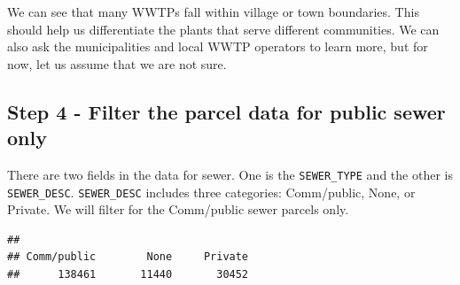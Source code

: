\documentclass[
]{book}
\newenvironment{Shaded}{\begin{snugshade}}{\end{snugshade}}
\newcommand{\CommentTok}[1]{\textcolor[rgb]{0.56,0.35,0.01}{\textit{#1}}}
\newcommand{\FunctionTok}[1]{\textcolor[rgb]{0.00,0.00,0.00}{#1}}
\newcommand{\NormalTok}[1]{#1}
\newcommand{\SpecialCharTok}[1]{\textcolor[rgb]{0.00,0.00,0.00}{#1}}
\begin{document}
We can see that many WWTPs fall within village or town boundaries. This should help us differentiate the plants that serve different communities. We can also ask the municipalities and local WWTP operators to learn more, but for now, let us assume that we are not sure.

\hypertarget{step-4---filter-the-parcel-data-for-public-sewer-only}{%
\subsection{Step 4 - Filter the parcel data for public sewer only}\label{step-4---filter-the-parcel-data-for-public-sewer-only}}

There are two fields in the data for sewer. One is the \texttt{SEWER\_TYPE} and the other is \texttt{SEWER\_DESC}. \texttt{SEWER\_DESC} includes three categories: Comm/public, None, or Private. We will filter for the Comm/public sewer parcels only.

\begin{Shaded}
\end{Shaded}

\begin{verbatim}
## 
## Comm/public        None     Private 
##      138461       11440       30452
\end{verbatim}
\end{document}
